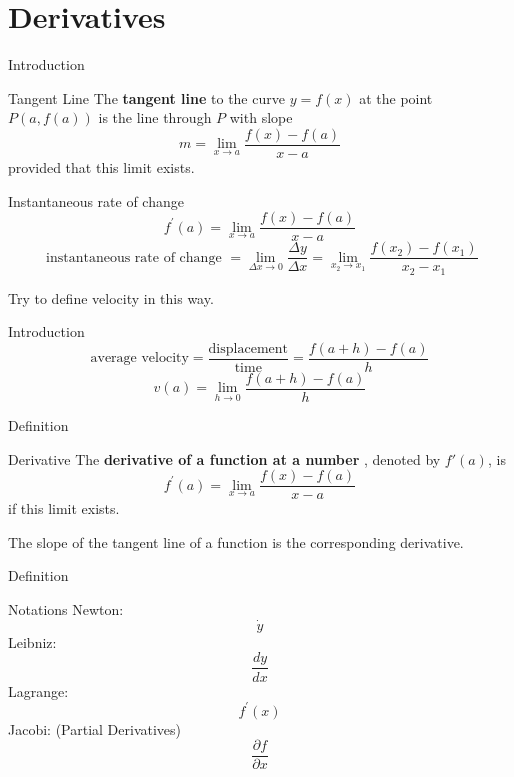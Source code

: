 \documentclass{beamer}
\begin{document}
\section{Derivatives}
\begin{frame}{Introduction}
    \begin{block}{Tangent Line}
        The \textbf{tangent line} to the curve $y=f(x)$ at the point $P(a, f(a))$ is the line through $P$ with slope
        $$
        m=\lim _{x \rightarrow a} \frac{f(x)-f(a)}{x-a}
        $$
        provided that this limit exists.
    \end{block}
    \begin{block}{Instantaneous rate of change}
        $$
        f^{\prime}(a)=\lim _{x \rightarrow a} \frac{f(x)-f(a)}{x-a}
        $$$$
        \text { instantaneous rate of change }=\lim _{\Delta x \rightarrow 0} \frac{\Delta y}{\Delta x}=\lim _{x_{2} \rightarrow x_{1}} \frac{f\left(x_{2}\right)-f\left(x_{1}\right)}{x_{2}-x_{1}}
        $$
    \end{block}
    Try to define velocity in this way.
\end{frame}

\begin{frame}{Introduction}
    $$
        \text{average velocity} = \frac{\text{displacement}}{\text{time}} = \frac{f(a+h)-f(a)}{h}
    $$
    $$v(a)=\lim _{h\rightarrow 0}\frac{f(a+h)-f(a)}{h}$$
\end{frame}

\begin{frame}{Definition}
    \begin{block}{Derivative}
        The \textbf{derivative of a function  at a number }, denoted by $f'(a)$, is
        $$
        f^{\prime}(a)=\lim _{x \rightarrow a} \frac{f(x)-f(a)}{x-a}
        $$
        if this limit exists.
    \end{block}
    The slope of the tangent line of a function is the corresponding derivative.
\end{frame}

\begin{frame}{Definition}
    \begin{block}{Notations}
        Newton: $$
        \dot{y}
        $$
        Leibniz:
        $$
        \frac{d y}{d x}
        $$
        Lagrange:
        $$
        f^{\prime}(x)
        $$
        Jacobi: (Partial Derivatives)
        $$
        \frac{\partial f}{\partial x}
        $$
    \end{block}
\end{frame}
\end{document}
